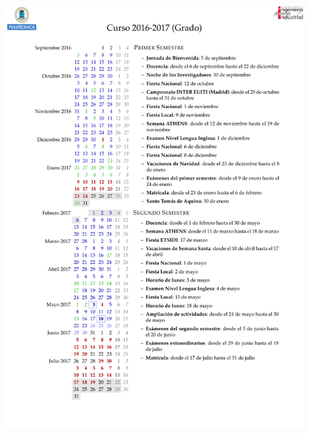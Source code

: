 \documentclass[spanish, xcolor={usenames,svgnames,dvipsnames}]{beamer}
\begin{document}
\begin{frame}[label={sec:orge3691da}]{}
\begin{center}
\includegraphics[width=.9\linewidth]{images/Calendario_Grado_2016_2017.pdf}
\end{center}
\end{frame}
\end{document}
